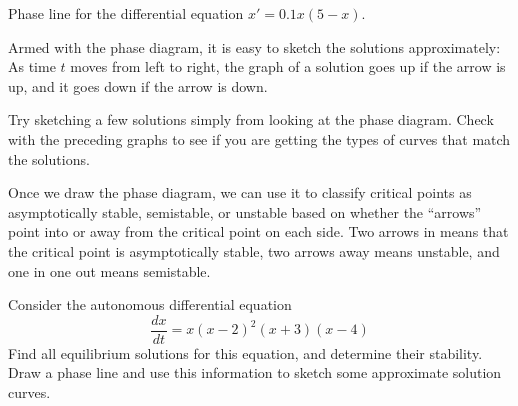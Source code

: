 \begin{myfig}
\caption{Phase line for the differential equation $x' = 0.1x(5-x)$.}
\label{fig:PL1}
\end{myfig}

\pagebreak[0]
Armed with the phase diagram,
it is easy to sketch the solutions approximately:  As time $t$
moves from left to right,
the graph of a solution
goes up if the arrow is up, and it goes down if the arrow is down.

\begin{exercise}
Try sketching a few solutions simply from looking at the phase diagram.
Check with the preceding graphs to see if
you are getting the types of curves that match the solutions.
\end{exercise}

\pagebreak[0]
Once we draw the phase diagram, we can use it to classify critical points
as asymptotically stable, semistable, or unstable based on whether the ``arrows'' point into or away from the critical point on each side. Two arrows in means that the critical point is asymptotically stable, two arrows away means unstable, and one in one out means semistable. 



\begin{example}
Consider the autonomous differential equation
\begin{equation}
\frac{dx}{dt} = x(x-2)^2(x+3)(x-4) \label{autoexample:eqn}
\end{equation}
Find all equilibrium solutions for this equation, and determine their stability. Draw a phase line and use this information to sketch some approximate solution curves. 
\end{example}

